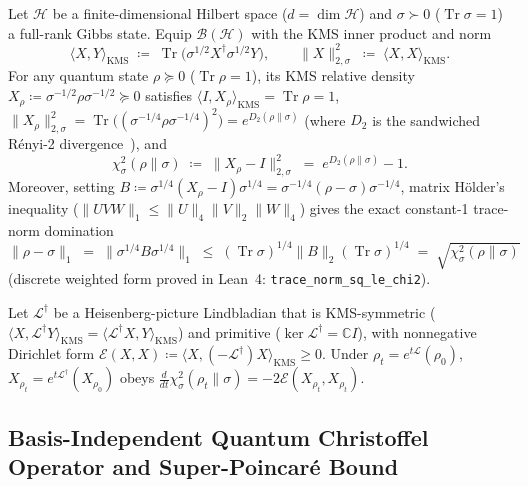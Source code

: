\documentclass[11pt,a4paper]{article}
\theoremstyle{definition}
\newcommand{\C}{\mathbb{C}}
\newcommand{\Tr}{\operatorname{Tr}}
\newcommand{\Edir}{\mathcal{E}}
\newcommand{\KMS}{\mathrm{KMS}}
\begin{document}
Let $\mathcal{H}$ be a finite-dimensional Hilbert space ($d = \dim\mathcal{H}$) and $\sigma \succ 0$ ($\Tr\sigma = 1$) a full-rank Gibbs state. Equip $\mathcal{B}(\mathcal{H})$ with the KMS inner product and norm
\begin{equation}
  \langle X, Y \rangle_{\KMS} \;\coloneqq\; \Tr\!\bigl(\sigma^{1/2} X^\dagger \sigma^{1/2} Y\bigr), \qquad
  \|X\|_{2,\sigma}^2 \;\coloneqq\; \langle X, X \rangle_{\KMS}.
  \label{eq:kms_ip}
\end{equation}
For any quantum state $\rho \succeq 0$ ($\Tr\rho = 1$), its KMS relative density $X_\rho \coloneqq \sigma^{-1/2}\rho\sigma^{-1/2} \succeq 0$ satisfies $\langle I, X_\rho \rangle_{\KMS} = \Tr\rho = 1$, $\|X_\rho\|_{2,\sigma}^2 = \Tr\bigl((\sigma^{-1/4}\rho\sigma^{-1/4})^2\bigr) = e^{D_2(\rho\|\sigma)}$ (where $D_2$ is the sandwiched R\'enyi-2 divergence~\cite{MullerLennert2013Sandwiched}), and
\begin{equation}
  \chi^2_\sigma(\rho\|\sigma) \;\coloneqq\; \|X_\rho - I\|_{2,\sigma}^2 \;=\; e^{D_2(\rho\|\sigma)} - 1.
  \label{eq:chi2_def}
\end{equation}
Moreover, setting $B \coloneqq \sigma^{1/4}(X_\rho - I)\sigma^{1/4} = \sigma^{-1/4}(\rho - \sigma)\sigma^{-1/4}$, matrix H\"older's inequality ($\|UVW\|_1 \le \|U\|_4\|V\|_2\|W\|_4$) gives the exact constant-1 trace-norm domination
\begin{equation}
  \|\rho - \sigma\|_1 \;=\; \|\sigma^{1/4} B \sigma^{1/4}\|_1 \;\le\; (\Tr\sigma)^{1/4}\|B\|_2 (\Tr\sigma)^{1/4} \;=\; \sqrt{\chi^2_\sigma(\rho\|\sigma)}
  \label{eq:trace_chi2}
\end{equation}
(discrete weighted form proved in Lean~4: \texttt{trace\_norm\_sq\_le\_chi2}).

Let $\mathcal{L}^\dagger$ be a Heisenberg-picture Lindbladian that is KMS-symmetric ($\langle X, \mathcal{L}^\dagger Y \rangle_{\KMS} = \langle \mathcal{L}^\dagger X, Y \rangle_{\KMS}$) and primitive ($\ker\mathcal{L}^\dagger = \C I$), with nonnegative Dirichlet form $\Edir(X, X) \coloneqq \langle X, (-\mathcal{L}^\dagger) X \rangle_{\KMS} \ge 0$. Under $\rho_t = e^{t\mathcal{L}}(\rho_0)$, $X_{\rho_t} = e^{t\mathcal{L}^\dagger}(X_{\rho_0})$ obeys $\frac{d}{dt}\chi^2_\sigma(\rho_t\|\sigma) = -2\Edir(X_{\rho_t}, X_{\rho_t})$.

\subsection{Basis-Independent Quantum Christoffel Operator and Super-Poincar\'e Bound}
\end{document}
